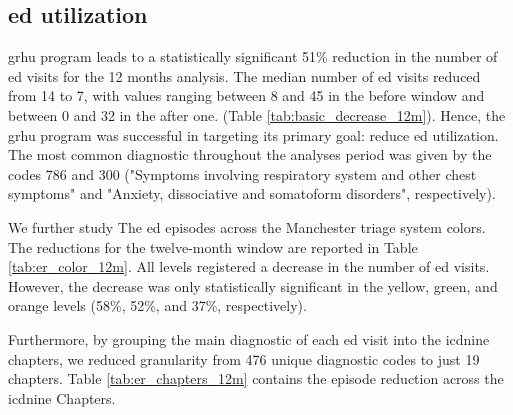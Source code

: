 \documentclass{bmcart}
\begin{document}
\subsection*{\gls{ed} utilization}
\gls{grhu} program leads to a statistically significant 51\% reduction in the number of \gls{ed} visits for the 12 months analysis. The median number of \gls{ed} visits reduced from 14 to 7, with values ranging between 8 and 45 in the before window and between 0 and 32 in the after one. (Table \ref{tab:basic_decrease_12m}). Hence, the \gls{grhu} program was successful in targeting its primary goal: reduce \gls{ed} utilization. The most common diagnostic throughout the analyses period was given by the codes 786 and 300 ("Symptoms involving respiratory system and other chest symptoms"  and "Anxiety, dissociative and somatoform disorders", respectively). 
\par We further study The \gls{ed} episodes across the Manchester triage system colors. 
The reductions for the twelve-month window are reported in Table \ref{tab:er_color_12m}. 
All levels registered a decrease in the number of \gls{ed} visits. 
However, the decrease was only statistically significant in the yellow, green, and orange levels (58\%, 52\%, and 37\%, respectively).
\par Furthermore, by grouping the main diagnostic of each \gls{ed} visit into the \gls{icdnine} chapters, we reduced granularity from 476 unique diagnostic codes to just 19 chapters. 
Table \ref{tab:er_chapters_12m} contains the episode reduction across the \gls{icdnine} Chapters.
\end{document}
